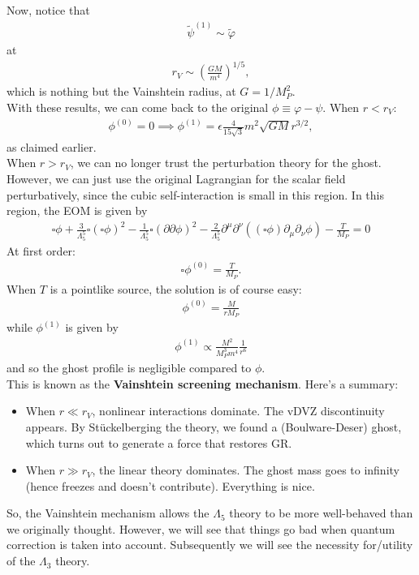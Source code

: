 \documentclass{book}
\theoremstyle{definition}
\newcommand{\p}{\partial}
\newcommand{\f}[2]{\frac{#1}{#2}}
\newcommand{\lp}{\left(}
\newcommand{\rp}{\right)}
\begin{document}
\begin{framed}
	Now, notice that 
	\begin{align}
	\tilde\psi^{(1)} \sim \tilde\varphi
	\end{align}
	at 
	\begin{align}
	r_V \sim\lp\f{GM}{m^4}\rp^{1/5},
	\end{align}
	which is nothing but the Vainshtein radius, at $G = 1/M_P^2$.\\
	
	With these results, we can come back to the original $\phi \equiv \varphi - \psi$. When $r < r_V$:
	\begin{align}
	\phi^{(0)} = 0 \implies \phi^{(1)} = \epsilon \f{4}{15\sqrt{3}}m^2 \sqrt{GM} r^{3/2},
	\end{align}
	as claimed earlier. \\
	
	When $r > r_V$, we can no longer trust the perturbation theory for the ghost. However, we can just use the original Lagrangian for the scalar field perturbatively, since the cubic self-interaction is small in this region. In this region, the EOM is given by
	\begin{align}
	\square \phi + \f{3}{\Lambda_5^5}\square (\square \phi)^2 - \f{1}{\Lambda_5^5}\square (\p \p \phi)^2 - \f{2}{\Lambda_5^5}\p^\mu \p^\nu ((\square \phi)\p_\mu \p_\nu \phi) - \f{T}{M_P} = 0
	\end{align}
	At first order:
	\begin{align}
	\square \phi^{(0)} = \f{T}{M_P} .
	\end{align} 
	When $T$ is a pointlike source, the solution is of course easy:
	\begin{align}
	\boxed{\phi^{(0)} = \f{M}{rM_P}}
	\end{align}
	while $\phi^{(1)}$ is given by
	\begin{align}
	\boxed{\phi^{(1)} \propto \f{M^2}{M^3_P m^4 } \f{1}{r^6}}
	\end{align}
	and so the ghost profile is negligible compared to $\phi$. \\
	
	This is known as  the \textbf{Vainshtein screening mechanism}. Here's a summary:
	\begin{itemize}
		\item When $r \ll r_V$, nonlinear interactions dominate. The vDVZ discontinuity appears. By St\"{u}ckelberging the theory, we found a (Boulware-Deser) ghost, which turns out to generate a force that restores GR. 
		\item When $r \gg r_V$, the linear theory dominates. The ghost mass goes to infinity (hence freezes and doesn't contribute). Everything is nice. 
	\end{itemize}
	So, the Vainshtein mechanism allows the $\Lambda_5$ theory to be more well-behaved than we originally thought. However, we will see that things go bad when quantum correction is taken into account. Subsequently we will see the necessity for/utility of the $\Lambda_3$ theory. 
\end{framed}
\end{document}

